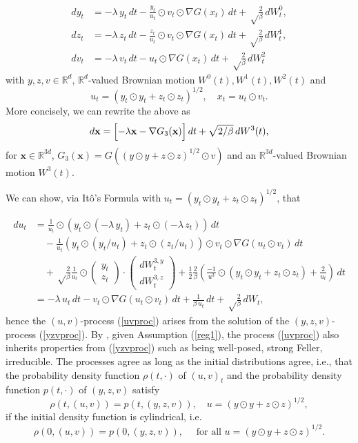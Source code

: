 \documentclass[11pt, twoside]{report}
\renewcommand{\vec}[1]{{\mathbf{#1}}}
\begin{document}
\begin{equation} 
\begin{split} 
dy_t&=-\lambda\,   y_t\,dt - \frac{y_t}{u_t} \odot v_t\odot \nabla G(x_t)\,dt
 +\sqrt\frac{2}{\beta}\,dW^0_t,\\
dz_t&=-\lambda\,   z_t\,dt - \frac{z_t}{u_t} \odot v_t\odot \nabla G(x_t)\,dt
 +\sqrt\frac{2}{\beta}\,dW^1_t,\\
dv_t&=-\lambda\,   v_t\,dt - u_t\odot \nabla G(x_t)\,dt
 +\sqrt\frac{2}{\beta}\,dW^2_t
\label{yzvproc}
\end{split}
\end{equation}
with $y,z,v \in \mathbb{R}^d$, $\mathbb{R}^{d}$-valued Brownian motion $W^0(t), W^1(t), W^2(t)$ and
\[u_t = (y_t \odot y_t + z_t \odot z_t)^{1/2}, \quad x_t = u_t \odot v_t.\]
More concisely, we can rewrite the above as 
\begin{equation}  
 \begin{aligned}
 d\vec x= \Bigl[-\lambda \vec x - \nabla G_{3}(\vec x)\Bigr]\,dt +\sqrt{2/\beta}\, dW^3(t),
  \end{aligned}\label{cyl}
\end{equation}
for $\vec x \in \mathbb{R}^{3d}$, $G_{3}(\vec x)= G( (y\odot y + z\odot z)^{1/2} \odot v)$ and an $\mathbb{R}^{3d}$-valued Brownian motion $W^3(t)$. 

We can show, via It\^{o}'s Formula with $u_t = (y_t \odot y_t + z_t \odot z_t)^{1/2}$, that 

$$
\begin{aligned}
  du_t&=\frac{1}{u_t}\odot(y_t\odot(-\lambda\,y_t)+z_t\odot(-\lambda\, z_t))\,dt\\&\quad
  -\frac{1}{u_t}(y_t\odot (y_t/u_t)+z_t\odot(z_t/u_t))\odot v_t\odot \nabla G(u_t\odot v_t)\,dt \\&\quad+\sqrt\frac{2}{\beta} \frac 1{u_t} \odot\begin{pmatrix}y_t\\z_t\end{pmatrix}
  \cdot\begin{pmatrix} dW_t^{3,y}\\ dW_t^{3,z}\end{pmatrix}
  + \frac 12 \frac{2}{\beta} \left(\frac{-1}{u^3}\odot(y_t\odot y_t+z_t\odot z_t)+\frac{2}{u_t}\right)\,dt\\
  &=-\lambda\,   u_t\,dt - v_t\odot \nabla G(u_t\odot v_t)\,dt
 +\frac{1}{\beta \,u_t}\,dt+ \sqrt\frac{2}{\beta}\,dW_t,
\end{aligned}
$$
hence the $(u,v)$-process (\ref{uvproc}) arises from the solution of the $(y,z,v)$-process (\ref{yzvproc}). By \cite[Theorem~3.1]{2025hadalangsamp}, given Assumption (\ref{reg1}), the process (\ref{uvproc}) also inherits properties from (\ref{yzvproc}) such as being well-posed, strong Feller, irreducible. The processes agree as long as the initial distributions agree, i.e., that the probability density function $\rho(t,\cdot)$ of $(u,v)_t$ and the probability density function $p(t,\cdot)$ of $(y,z,v)$ satisfy
\[\rho(t,(u,v)) = p(t,(y,z,v)), \quad u = (y \odot y + z \odot z)^{1/2},\]
if the initial density function is cylindrical, i.e.
\[\rho(0,(u,v)) = p(0,(y,z,v)), \quad \text{ for all } u = (y \odot y + z \odot z)^{1/2}.\]
\end{document}
